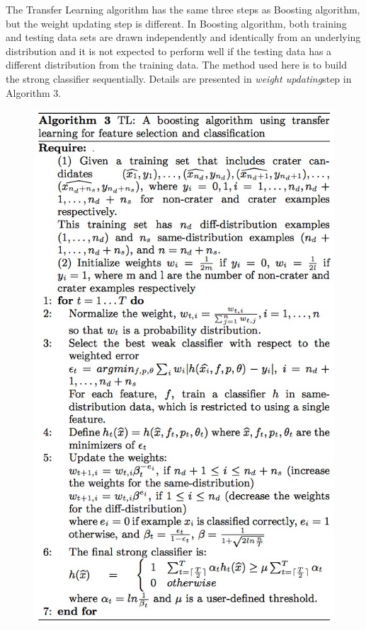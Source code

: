 \documentclass[conference]{IEEEtran}
\begin{document}
The Transfer Learning algorithm has the same three steps as Boosting algorithm, but the weight updating step is different. In Boosting algorithm, both training and testing data sets are drawn independently and identically from an underlying distribution and it is not expected to perform well if the testing data has a different distribution from the training data. The method used here is to build the  strong classifier sequentially. Details are presented in {\it weight updating}step in Algorithm 3.

\begin{figure}[!hb]
\begin{center}
\includegraphics[scale=0.45]{TL.png}
\label{default}
\end{center}
\end{figure}
\end{document}
